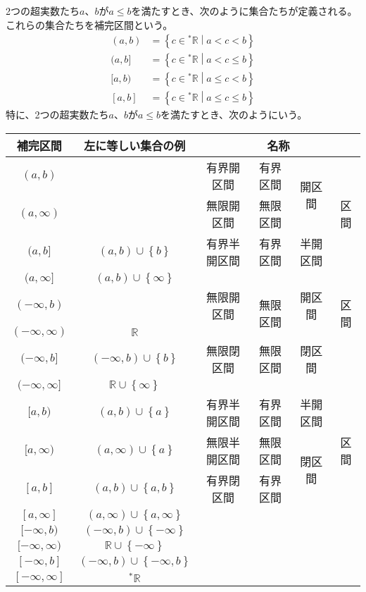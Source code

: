 \documentclass[dvipdfmx]{jsarticle}
\begin{document}
\begin{dfn}
2つの超実数たち$a$、$b$が$a \leq b$を満たすとき、次のように集合たちが定義される。これらの集合たちを補完区間という。
\begin{align*}
(a,b) &= \left\{ c \in{}^{*}\mathbb{R} \middle| a < c < b \right\}\\
(a,b] &= \left\{ c \in{}^{*}\mathbb{R} \middle| a < c \leq b \right\}\\
[ a,b) &= \left\{ c \in{}^{*}\mathbb{R} \middle| a \leq c < b \right\}\\
[ a,b] &= \left\{ c \in{}^{*}\mathbb{R} \middle| a \leq c \leq b \right\}
\end{align*}
特に、2つの超実数たち$a$、$b$が$a \leq b$を満たすとき、次のようにいう。
\begin{longtable}[c]{|c|c|c|c|c|c|}
\hline
補完区間 & 左に等しい集合の例 & \multicolumn{4}{c|}{名称} \\
\hline \hline
$(a,b)$ & & 有界開区間 & 有界区間 & \multirow{2}{*}{開区間} & \multirow{3}{*}{区間} \\\cline{1-4}
$(a,\infty)$ & & 無限開区間 & 無限区間 & & \\\cline{1-5}
$(a,b]$ & $(a,b) \cup \left\{ b \right\}$ & 有界半開区間 & 有界区間 & 半開区間 & \\\hline
$(a,\infty]$ & $(a,b) \cup \left\{ \infty \right\}$ & & & & \\\hline
$( - \infty,b)$ & & 無限開区間 & \multirow{2}{*}{無限区間} & 開区間 & \multirow{2}{*}{区間} \\\cline{1-3} \cline{5-5}
$( - \infty,\infty)$ & $\mathbb{R}$ & & & & \\\hline
$( - \infty,b]$ & $( - \infty,b) \cup \left\{ b \right\}$ & 無限閉区間 & 無限区間 & 閉区間 & \\\hline
$( - \infty,\infty]$ & $\mathbb{R} \cup \left\{ \infty \right\}$ & & & & \\\hline
$[ a,b)$ & $(a,b) \cup \left\{ a \right\}$ & 有界半開区間 & 有界区間 & 半開区間 & \multirow{3}{*}{区間} \\\cline{1-5}
$[ a,\infty)$ & $(a,\infty) \cup \left\{ a \right\}$ & 無限半開区間 & 無限区間 & \multirow{2}{*}{閉区間} & \\\cline{1-4}
$[ a,b]$ & $(a,b) \cup \left\{ a,b \right\}$ & 有界閉区間 & 有界区間 & & \\\hline
$[ a,\infty]$ & $(a,\infty) \cup \left\{ a,\infty \right\}$ & \multirow{5}{*}{} & \multirow{5}{*}{} & \multirow{5}{*}{} & \multirow{5}{*}{} \\\cline{1-2}
$[ - \infty,b)$ & $( - \infty,b) \cup \left\{ - \infty \right\}$ & & & & \\\cline{1-2}
$[ - \infty,\infty)$ & $\mathbb{R} \cup \left\{ - \infty \right\}$ & & & & \\\cline{1-2}
$[ - \infty,b]$ & $( - \infty,b) \cup \left\{ - \infty,b \right\}$ & & & & \\\cline{1-2}
$[ - \infty,\infty]$ & ${}^{*}\mathbb{R}$ & & & & \\\hline
\end{longtable}
\end{dfn}
\end{document}
